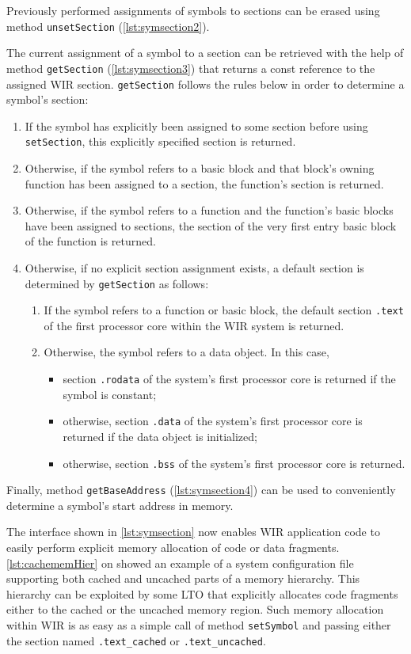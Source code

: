 Previously performed assignments of symbols to sections can be erased using method \texttt{unsetSection} (\cref{lst:symsection2}).

The current assignment of a symbol to a section can be retrieved with the help of method \texttt{getSection} (\cref{lst:symsection3}) that returns a const reference to the assigned \gls{WIR} section.
\texttt{getSection} follows the rules below in order to determine a symbol's section:
\begin{enumerate}
  \item If the symbol has explicitly been assigned to some section before using \texttt{setSection}, this explicitly specified section is returned.
  \item Otherwise, if the symbol refers to a basic block and that block's owning function has been assigned to a section, the function's section is returned.
  \item Otherwise, if the symbol refers to a function and the function's basic blocks have been assigned to sections, the section of the very first entry basic block of the function is returned.
  \item Otherwise, if no explicit section assignment exists, a default section is determined by \texttt{getSection} as follows:
  \begin{enumerate}
    \item If the symbol refers to a function or basic block, the default section \texttt{.text} of the first processor core within the \gls{WIR} system is returned.
    \item Otherwise, the symbol refers to a data object. In this case,
    \begin{itemize}
      \item section \texttt{.rodata} of the system's first processor core is returned if the symbol is constant;
      \item otherwise, section \texttt{.data} of the system's first processor core is returned if the data object is initialized;
      \item otherwise, section \texttt{.bss} of the system's first processor core is returned.
    \end{itemize}
  \end{enumerate}
\end{enumerate}

Finally, method \texttt{getBaseAddress} (\cref{lst:symsection4}) can be used to conveniently determine a symbol's start address in memory.

The interface shown in \cref{lst:symsection} now enables \gls{WIR} application code to easily perform explicit memory allocation of code or data fragments.
\cref{lst:cachememHier} on  showed an example of a system configuration file supporting both cached and uncached parts of a memory hierarchy.
This hierarchy can be exploited by some \acrfull{LTO} that explicitly allocates code fragments either to the cached or the uncached memory region.
Such memory allocation within \gls{WIR} is as easy as a simple call of method \texttt{setSymbol} and passing either the section named \texttt{.text\_cached} or \texttt{.text\_uncached}.

